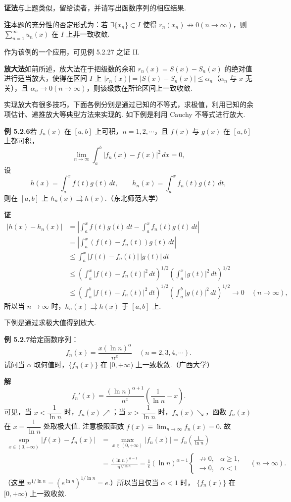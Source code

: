 \documentclass[UTF8, 12pt, fontset=fandol, oneside]{ctexart}
\begin{document}
\noindent\textbf{证法}\quad 与上题类似，留给读者，并请写出函数序列的相应结果.

\noindent\textbf{注}\quad 本题的充分性的否定形式为：若 $\exists\{x_n\}\subset I$ 使得
$r_n(x_n)\not\to0(n\to\infty)$，则
$\displaystyle\sum_{n=1}^{\infty}u_n(x)$ 在 $I$ 上非一致收敛.

作为该例的一个应用，可见例 5.2.27 之证 II.

\noindent\textbf{放大法}\quad 如前所述，放大法在于把级数的余和
$r_n(x)=S(x)-S_n(x)$ 的绝对值进行适当放大，使得在区间 $I$ 上
$|r_n(x)|=|S(x)-S_n(x)|\le\alpha_n$（$\alpha_n$ 与 $x$ 无关），且
$\alpha_n\to0(n\to\infty)$，则该级数在所论区间上一致收敛.

实现放大有很多技巧，下面各例分别是通过已知的不等式，求极值，利用已知的余项估计、递推放大等典型方法来实现的. 如下例是利用 Cauchy 不等式进行放大.

\noindent\textbf{例 5.2.6}\quad 若 $f_n(x)$ 在 $[a,b]$ 上可积，$n=1,2,\cdots$，且
$f(x)$ 与 $g(x)$ 在 $[a,b]$ 上都可积，
\[
  \lim_{n\to\infty}\int_a^b|f_n(x)-f(x)|^2\,dx=0,
\]
设
\[
  h(x)=\int_a^x f(t)g(t)\,dt,\qquad
  h_n(x)=\int_a^x f_n(t)g(t)\,dt,
\]
则在 $[a,b]$ 上 $h_n(x)\rightrightarrows h(x)$.（东北师范大学）

\noindent\textbf{证}\quad
\[
\begin{aligned}
|h(x)-h_n(x)|
&=\left|\int_a^x f(t)g(t)\,dt-\int_a^x f_n(t)g(t)\,dt\right|\\
&=\left|\int_a^x(f(t)-f_n(t))g(t)\,dt\right|\\
&\le\int_a^x|f(t)-f_n(t)|\,|g(t)|\,dt\\
&\le\left(\int_a^x|f(t)-f_n(t)|^2\,dt\right)^{1/2}
     \left(\int_a^x|g(t)|^2\,dt\right)^{1/2}\\
&\le\left(\int_a^b|f(t)-f_n(t)|^2\,dt\right)^{1/2}
     \left(\int_a^b|g(t)|^2\,dt\right)^{1/2}\to0\quad(n\to\infty),
\end{aligned}
\]
所以当 $n\to\infty$ 时，$h_n(x)\rightrightarrows h(x)$ 于 $[a,b]$ 上.

下例是通过求极大值得到放大.

\noindent\textbf{例 5.2.7}\quad 给定函数序列：
\[
  f_n(x)=\frac{x(\ln n)^\alpha}{n^x}\quad(n=2,3,4,\cdots).
\]
试问当 $\alpha$ 取何值时，$\{f_n(x)\}$ 在 $[0,+\infty)$ 上一致收敛.（广西大学）

\noindent\textbf{解}\quad
\[
  f_n'(x)=\frac{(\ln n)^{\alpha+1}}{n^x}\left(\frac1{\ln n}-x\right).
\]
可见，当 $x<\dfrac1{\ln n}$ 时，$f_n(x)\nearrow$；当
$x>\dfrac1{\ln n}$ 时，$f_n(x)\searrow$，函数 $f_n(x)$ 在
$x=\dfrac1{\ln n}$ 处取极大值. 注意极限函数
$f(x)\equiv\lim_{n\to\infty}f_n(x)=0$. 故
\[
\begin{aligned}
\sup_{x\in(0,+\infty)}|f(x)-f_n(x)|
&=\max_{x\in(0,+\infty)}|f_n(x)|
 =f_n\left(\frac1{\ln n}\right)\\
&=\frac{(\ln n)^{\alpha-1}}{n^{1/\ln n}}
 =\frac1e(\ln n)^{\alpha-1}
\begin{cases}
\not\to0, & \alpha\ge1,\\
\to0, & \alpha<1
\end{cases}
\quad(n\to\infty).
\end{aligned}
\]
（这里 $n^{1/\ln n}=(e^{\ln n})^{1/\ln n}=e$.）所以当且仅当 $\alpha<1$ 时，
$\{f_n(x)\}$ 在 $[0,+\infty)$ 上一致收敛.
\end{document}
